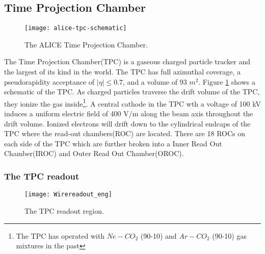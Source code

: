 
\subsection{Time Projection Chamber}\label{sec:tpc}

\begin{figure}[h]
\texttt{[image: alice-tpc-schematic]}
\centering
\caption{The ALICE Time Projection Chamber\cite{2010NIMPA.622..316A}.}
\label{fig:TPC}
\end{figure}

The Time Projection Chamber(TPC)\cite{2010NIMPA.622..316A} is a gaseous charged particle tracker and the largest of its kind in the world.  The TPC has full azimuthal coverage, a pseudorapidity acceptance of $ \left | \eta \right | \leq 0.7$, and a volume of 93 $m^{2}$.  Figure \ref{fig:TPC} shows a schematic of the TPC.  As charged particles traverse the drift volume of the TPC, they ionize the gas inside\footnote{The TPC has operated with $Ne-CO_{2}$ (90-10) and $Ar-CO_{2}$ (90-10) gas mixtures in the past}.  A central cathode in the TPC wth a voltage of 100 kV induces a uniform electric field of 400 V/m along the beam axis throughout the drift volume.  Ionized electrons will drift down to the cylindrical endcaps of the TPC where the read-out chambers(ROC) are located.  There are 18 ROCs on each side of the TPC which are further broken into a Inner Read Out Chamber(IROC) and Outer Read Out Chamber(OROC).  

\subsubsection{The TPC readout}\label{sec:tpcread}

\begin{figure}[h]
\texttt{[image: Wirereadout\_eng]}
\centering
\caption{The TPC readout region\cite{diener}.}
\label{fig:TPCreadout}
\end{figure}

